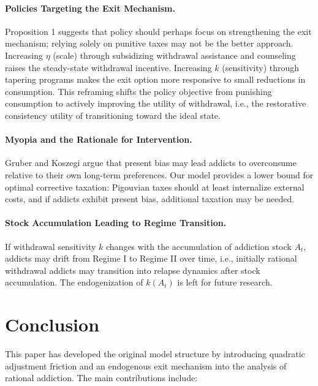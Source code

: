 \documentclass[12pt]{article}
\begin{document}
\paragraph{Policies Targeting the Exit Mechanism.} Proposition 1 suggests that policy should perhaps focus on strengthening the exit mechanism;
relying solely on punitive taxes may not be the better approach. Increasing $\eta$ (scale) through subsidizing withdrawal assistance and counseling
raises the steady-state withdrawal incentive. Increasing $k$ (sensitivity) through tapering programs makes the exit option more responsive to small reductions in consumption.
This reframing shifts the policy objective from punishing consumption to actively improving the utility of withdrawal, i.e., the restorative consistency utility of transitioning toward the ideal state.

\paragraph{Myopia and the Rationale for Intervention.} Gruber and Koszegi \cite{Gruber2001} argue that present bias may
lead addicts to overconsume relative to their own long-term preferences. Our model provides a lower bound for optimal corrective taxation: Pigouvian taxes
should at least internalize external costs, and if addicts exhibit present bias, additional taxation may be needed.

\paragraph{Stock Accumulation Leading to Regime Transition.} If withdrawal sensitivity $k$ changes with the accumulation of addiction stock $A_t$,
addicts may drift from Regime I to Regime II over time, i.e., initially rational withdrawal addicts may transition into relapse dynamics after stock accumulation.
The endogenization of $k(A_t)$ is left for future research.


\section{Conclusion}

This paper has developed the original model structure by introducing quadratic adjustment friction and an endogenous exit mechanism into the analysis of rational addiction.
The main contributions include:
\end{document}
